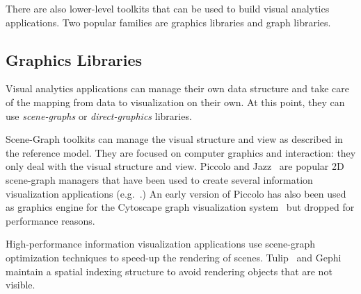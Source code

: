 There are also lower-level toolkits that can be used to build visual
analytics applications.  Two popular families are graphics libraries
and graph libraries.


\subsection{Graphics Libraries}

Visual analytics applications can manage their own data structure and
take care of the mapping from data to visualization on their own.  At
this point, they can use \emph{scene-graphs} or \emph{direct-graphics}
libraries.  

Scene-Graph toolkits can manage the visual structure and view as
described in the reference model.  They are focused on computer
graphics and interaction: they only deal with the visual structure and
view.  Piccolo and Jazz~\cite{Polylithic} are popular 2D scene-graph
managers that have been used to create several information
visualization applications (e.g.~\cite{SpaceTree,Geneaquilt}.) An
early version of Piccolo has also been used as graphics engine for the
Cytoscape graph visualization system~\cite{Cytoscape} but dropped for
performance reasons.

High-performance information visualization applications use
scene-graph optimization techniques to speed-up the rendering of
scenes.  Tulip~\cite{Tulip} and Gephi~\cite{Gephi} maintain a spatial
indexing structure to avoid rendering objects that are not visible.

